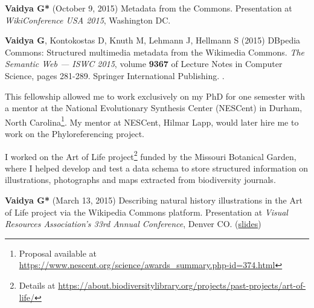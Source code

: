 \documentclass[12pt,letter]{article}
\begin{document}
\begin{publications}

\item \textbf{Vaidya G*} (October 9, 2015) Metadata from the Commons. Presentation at \textit{WikiConference USA 2015}, Washington DC.

\item \textbf{Vaidya G}, Kontokostas D, Knuth M, Lehmann J, Hellmann S (2015) DBpedia Commons: Structured multimedia metadata from the Wikimedia Commons. \textit{The Semantic Web --- ISWC 2015}, volume \textbf{9367} of Lecture Notes in Computer Science, pages 281-289. Springer International Publishing. .

\end{publications}


\nopagebreak
This fellowship allowed me to work exclusively on my PhD for one semester with a mentor at the National Evolutionary Synthesis Center (NESCent) in Durham, North Carolina\footnote{Proposal available at \url{https://www.nescent.org/science/awards\_summary.php-id=374.html}}. My mentor at NESCent, Hilmar Lapp, would later hire me to work on the Phyloreferencing project.


I worked on the Art of Life project\footnote{Details at \url{https://about.biodiversitylibrary.org/projects/past-projects/art-of-life/}} funded by the Missouri Botanical Garden, where I helped develop and test a data schema to store structured information on illustrations, photographs and maps extracted from biodiversity journals.

\begin{publications}

\item \textbf{Vaidya G*} (March 13, 2015) Describing natural history illustrations in the Art of Life project via the Wikipedia Commons platform. Presentation at \textit{Visual Resources Association's 33rd Annual Conference}, Denver CO. (\href{https://speakerdeck.com/gaurav/vra-2015-describing-natural-history-illustrations-in-the-art-of-life-project-via-the-wikipedia-commons-platform}{slides})

\end{publications}

\end{document}
